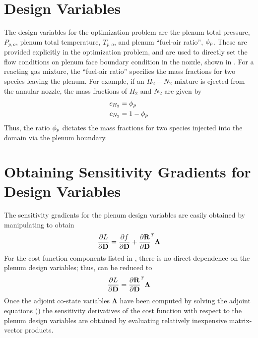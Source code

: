 \section{Design Variables}

The design variables for the optimization problem are the plenum total pressure,
$P_{p,o}$, plenum total temperature, $T_{p,o}$, and plenum ``fuel-air ratio'',
$\phi_p$.  These are provided explicitly in the optimization problem, and are used
to directly set the flow conditions on plenum face boundary condition in the
nozzle, shown in .  For a reacting gas mixture, the
``fuel-air ratio'' specifies the mass fractions for two species leaving the
plenum.  For example, if an $H_2-N_2$ mixture is ejected from the annular
nozzle, the mass fractions of $H_2$ and $N_2$ are given by
\begin{equation}
  \begin{aligned}
    c_{H_2} &= \phi_p \\
    c_{N_2} &= 1 - \phi_p
  \end{aligned}
  \label{fuel-air-def}
\end{equation}
Thus, the ratio $\phi_p$ dictates the mass fractions for two species injected into
the domain via the plenum boundary.

\section{Obtaining Sensitivity Gradients for Design Variables}

The sensitivity gradients for the plenum design variables are easily obtained by
manipulating  to obtain
\begin{equation}
  \pd{L}{\md} = \pd{f}{\md} + \rtdiff{}{\md} \mathbf{\Lambda}
  \label{obj-linearization1}
\end{equation}
For the cost function components listed in , there is
no direct dependence on the plenum design variables; thus,
 can be reduced to
\begin{equation}
  \pd{L}{\md} = \rtdiff{}{\md} \mathbf{\Lambda}
  \label{obj-linearization2}
\end{equation}
Once the adjoint co-state variables $\mathbf{\Lambda}$ have been computed by
solving the adjoint equations () the sensitivity derivatives
of the cost function with respect to the plenum design variables are obtained by
evaluating relatively inexpensive matrix-vector products.


